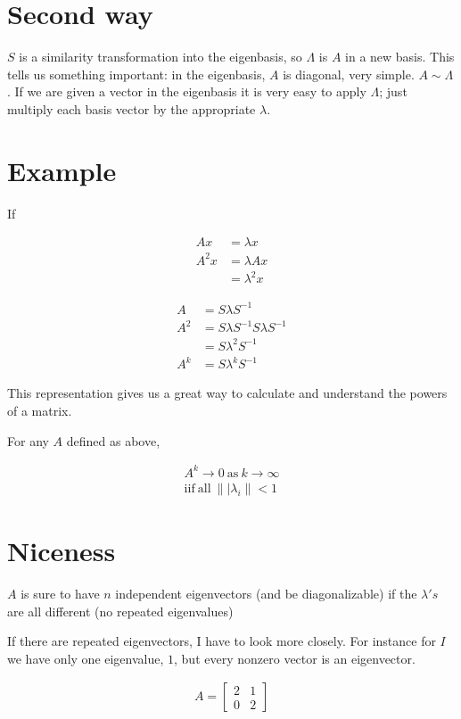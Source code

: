 \documentclass{article}
\begin{document}
\section{Second way}
$S$ is a similarity transformation into the eigenbasis, so $\Lambda$ is $A$ in a new basis. This tells us something important: in the eigenbasis, $A$ is diagonal, very simple. $A \sim \Lambda$. If we are given a vector in the eigenbasis it is very easy to apply $\Lambda$; just multiply each basis vector by the appropriate $\lambda$.

\section{Example}

If

\begin{align}
Ax &= \lambda x \\
A^2 x &= \lambda Ax \\
&= \lambda^2 x
\end{align}

\begin{align}
A &= S \lambda S^{-1} \\
A^2 &= S \lambda S^{-1} S \lambda S^{-1} \\
&= S \lambda^2 S^{-1} \\
A^k &= S \lambda^k S^{-1}
\end{align}

This representation gives us a great way to calculate and understand the powers of a matrix.

For any $A$ defined as above,

\begin{align}
A^k \rightarrow 0 \mathrm{\ as\ } k \rightarrow \infty \\
\mathrm{iif\ all\ } \||\lambda_i\| < 1
\end{align}

\section{Niceness}

$A$ is sure to have $n$ independent eigenvectors (and be diagonalizable) if the $\lambda's$ are all different (no repeated eigenvalues)

If there are repeated eigenvectors, I have to look more closely. For instance for $I$ we have only one eigenvalue, $1$, but every nonzero vector is an eigenvector.

\begin{align}
A = 
\begin{bmatrix}
2 & 1 \\
0 & 2
\end{bmatrix}
\end{align}
\end{document}
